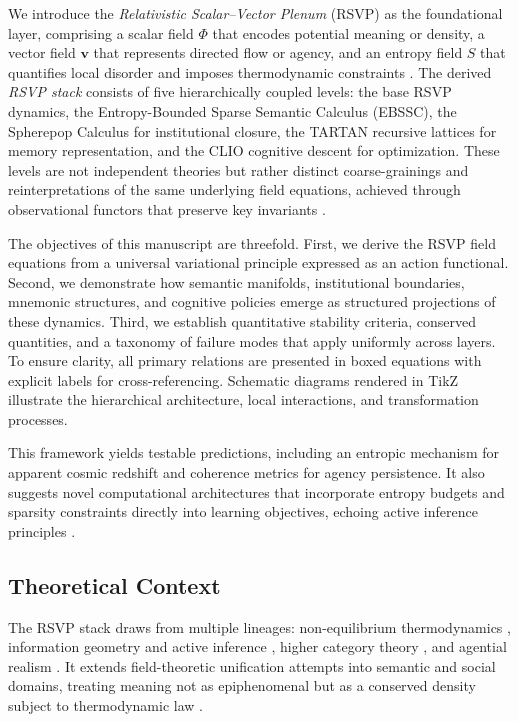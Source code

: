\documentclass[11pt]{article}
\theoremstyle{definition}
\theoremstyle{remark}
\newcommand{\vect}[1]{\bm{#1}}
\begin{document}
We introduce the \emph{Relativistic Scalar–Vector Plenum} (RSVP) as the foundational layer, comprising a scalar field $\Phi$ that encodes potential meaning or density, a vector field $\vect{v}$ that represents directed flow or agency, and an entropy field $S$ that quantifies local disorder and imposes thermodynamic constraints \cite{Prigogine1980,Deacon2012}. The derived \emph{RSVP stack} consists of five hierarchically coupled levels: the base RSVP dynamics, the Entropy-Bounded Sparse Semantic Calculus (EBSSC), the Spherepop Calculus for institutional closure, the TARTAN recursive lattices for memory representation, and the CLIO cognitive descent for optimization. These levels are not independent theories but rather distinct coarse-grainings and reinterpretations of the same underlying field equations, achieved through observational functors that preserve key invariants \cite{Baez2011}.

The objectives of this manuscript are threefold. First, we derive the RSVP field equations from a universal variational principle expressed as an action functional. Second, we demonstrate how semantic manifolds, institutional boundaries, mnemonic structures, and cognitive policies emerge as structured projections of these dynamics. Third, we establish quantitative stability criteria, conserved quantities, and a taxonomy of failure modes that apply uniformly across layers. To ensure clarity, all primary relations are presented in boxed equations with explicit labels for cross-referencing. Schematic diagrams rendered in TikZ illustrate the hierarchical architecture, local interactions, and transformation processes.

This framework yields testable predictions, including an entropic mechanism for apparent cosmic redshift and coherence metrics for agency persistence. It also suggests novel computational architectures that incorporate entropy budgets and sparsity constraints directly into learning objectives, echoing active inference principles \cite{Friston2021}.

\subsection*{Theoretical Context}
The RSVP stack draws from multiple lineages: non-equilibrium thermodynamics \cite{Prigogine1980,Haken1983}, information geometry and active inference \cite{Friston2019}, higher category theory \cite{Lurie2009}, and agential realism \cite{Barad2007}. It extends field-theoretic unification attempts \cite{BaezStay2010} into semantic and social domains, treating meaning not as epiphenomenal but as a conserved density subject to thermodynamic law \cite{Deacon2012}.
\end{document}
